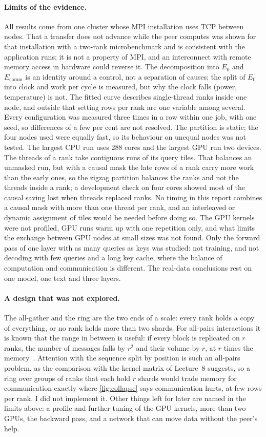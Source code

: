\paragraph{Limits of the evidence.} All results come from one cluster whose MPI
installation uses TCP between nodes. That a transfer does not advance while the
peer computes was shown for that installation with a two-rank microbenchmark and
is consistent with the application runs; it is not a property of MPI, and an
interconnect with remote memory access in hardware could reverse it. The
decomposition into $E_0$ and $E_\text{comm}$ is an identity around a control, not a
separation of causes; the split of $E_0$ into clock and work per cycle is measured,
but why the clock falls (power, temperature) is not. The fitted curve describes
single-thread ranks inside one node, and outside that setting rows per rank are
one variable among several. Every
configuration was measured three times in a row within one job, with one seed, so
differences of a few per cent are not resolved. The partition is static; the four
nodes used were equally fast, so its behaviour on unequal nodes was not tested.
The largest CPU run uses 288 cores and the largest GPU run two devices. The
threads of a rank take contiguous runs of its query tiles. That balances an
unmasked run, but with a causal mask the late rows of a rank carry more work than
the early ones, so the zigzag partition balances the ranks and not the threads
inside a rank; a development check on four cores showed most of the causal saving
lost when threads replaced ranks. No timing in this report combines a causal mask
with more than one thread per rank, and an interleaved or dynamic assignment of
tiles would be needed before doing so. The GPU
kernels were not profiled, GPU runs warm up with one repetition only, and what
limits the exchange between GPU nodes at small sizes was not found. Only the
forward pass of one layer with as many queries as keys was studied: not training,
and not decoding with few queries and a long key cache, where the balance of
computation and communication is different. The real-data conclusions rest on one
model, one text and three layers.

\paragraph{A design that was not explored.} The all-gather and the ring are the two
ends of a scale: every rank holds a copy of everything, or no rank holds more than
two shards. For all-pairs interactions it is known that the range in between is
useful: if every block is replicated on $r$ ranks, the number of messages falls
by $r^2$ and their volume by $r$, at $r$ times the memory~\cite{canbody}.
Attention with the sequence split by position is such an all-pairs problem, as the
comparison with the kernel matrix of Lecture~8 suggests, so a ring over groups of
ranks that each hold $r$ shards would trade memory for communication exactly
where \cref{fig:collapse} says communication hurts, at few rows per rank. I did not
implement it. Other things left for later are named in the limits above: a
profile and further tuning of the GPU kernels, more than two GPUs, the backward
pass, and a network that can move data without the peer's help.

